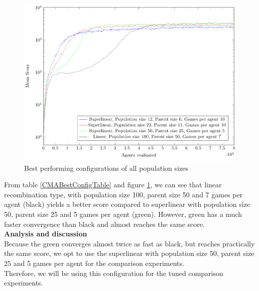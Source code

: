 \begin{figure}[H]
\centering
\includegraphics[scale=0.8]{data/cma_population_offspring/bestofall_population/PlotFile.pdf}
\caption{Best performing configurations of all population sizes \label{CMABestConfigPlot}}
\end{figure}

From table \ref{CMABestConfigTable} and figure \ref{CMABestConfigPlot}, we can see that
linear recombination type, with population size 100, parent size 50 and 7 games per agent
(black) yields a better score compared to superlinear with population size 50, parent size 25 and 5 games per agent (green).
However, green has a much faster convergence than black and almost reaches the same score.\\

\newpage
\textbf{Analysis and discussion}\\
Because the green converges almost twice as fast as black, but reaches practically the same
score, we opt to use the superlinear with population size 50, parent size 25 and 5 games per agent for the comparison experiments.\\
Therefore, we will be using this configuration for the tuned comparison experiments.








